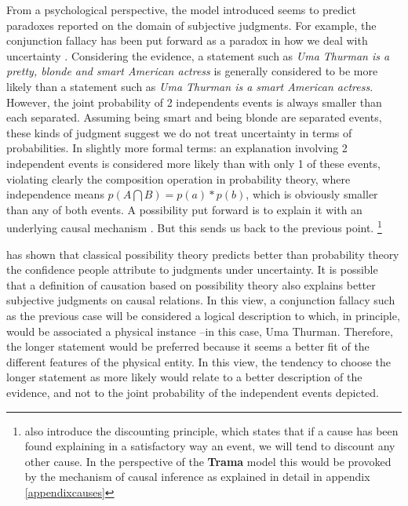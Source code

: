 \documentclass[
		twoside,openright,titlepage,numbers=noenddot,manychapters,
		headinclude,%
                footinclude=false,cleardoublepage=empty,
                BCOR=5mm,
		fontsize=11pt, %
                 enabledeprecatedfontcommands]{scrreprt}
\begin{document}
From a psychological perspective, the model introduced seems to predict paradoxes reported on the domain of subjective judgments. For example, the conjunction fallacy  has been put forward as a paradox in how we deal with uncertainty \cite[]{Tversky1983}. Considering the evidence, a statement such as \emph{Uma Thurman is a pretty, blonde and smart American actress} is generally considered to be more likely than a statement such as \emph{Uma Thurman is a smart American actress}. However, the joint probability of 2 independents events is always smaller than each separated.  Assuming being smart and being blonde are separated events, these kinds of judgment suggest we do not treat uncertainty in terms of probabilities. In slightly more formal terms: an explanation involving 2 independent events is considered more likely than with only 1 of these events, violating clearly the composition operation in probability theory, where independence means $p(A \bigcap B)= p(a)* p(b)$, which is obviously smaller than any of both events. A possibility put forward is to explain it with an underlying causal mechanism  \cite[]{ahn1996cas}. But this sends us back to the previous point. \footnote{\cite[]{ahn1996cas} also introduce the discounting principle, which states that if a cause has been found explaining in a satisfactory way an event, we will tend to discount any other cause. In the perspective of the \textbf{Trama} model this would be provoked by the mechanism of causal inference as explained in detail in  appendix \ref{appendixcauses}} 



\cite{raufaste2003tdv} has shown that classical possibility theory \cite[]{zadeh1999fuzzy} predicts better than probability theory the confidence people attribute to judgments under uncertainty.  It is possible that a definition of causation based on possibility theory also explains better subjective judgments on causal relations. In this view, a conjunction fallacy such as the previous case will be considered a logical description to which, in principle, would be associated a physical instance --in this case, Uma Thurman. Therefore, the longer statement would be preferred because it seems a better fit of the different features of the physical entity. In this view, the tendency to choose the longer statement as more likely would relate to a better description of the evidence, and not to the joint probability of the independent events depicted.
\end{document}
